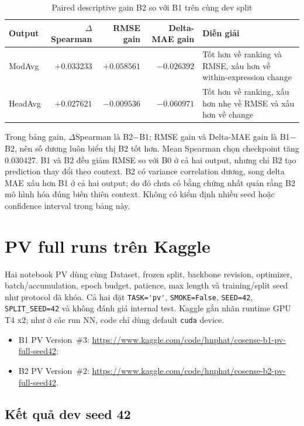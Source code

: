 \documentclass[11pt,a4paper]{article}
\newcommand{\code}[1]{\nolinkurl{#1}}
\begin{document}
\begin{table}[htbp]
\centering
\caption{Paired descriptive gain B2 so với B1 trên cùng dev split}
\small
\begin{tabularx}{\textwidth}{@{}lrrrY@{}}
\toprule
Output & $\Delta$Spearman & RMSE gain & Delta-MAE gain & Diễn giải \\
\midrule
ModAvg & $+0.033233$ & $+0.058561$ & $-0.026392$ & Tốt hơn về ranking và RMSE, xấu hơn về within-expression change \\
HeadAvg & $+0.027621$ & $-0.009536$ & $-0.060971$ & Tốt hơn về ranking, xấu hơn nhẹ về RMSE và xấu hơn về change \\
\bottomrule
\end{tabularx}
\end{table}

Trong bảng gain, $\Delta$Spearman là B2$-$B1; RMSE gain và Delta-MAE gain là B1$-$B2, nên số dương luôn biểu thị B2 tốt hơn. Mean Spearman chọn checkpoint tăng 0.030427. B1 và B2 đều giảm RMSE so với B0 ở cả hai output, nhưng chỉ B2 tạo prediction thay đổi theo context. B2 có variance correlation dương, song delta MAE xấu hơn B1 ở cả hai output; do đó chưa có bằng chứng nhất quán rằng B2 mô hình hóa đúng biến thiên context. Không có kiểm định nhiều seed hoặc confidence interval trong bảng này.

\section{PV full runs trên Kaggle}

Hai notebook PV dùng cùng Dataset, frozen split, backbone revision, optimizer, batch/accumulation, epoch budget, patience, max length và training/split seed như protocol đã khóa. Cả hai đặt \code{TASK='pv'}, \code{SMOKE=False}, \code{SEED=42}, \code{SPLIT_SEED=42} và không đánh giá internal test. Kaggle gắn nhãn runtime GPU T4 x2; như ở các run NN, code chỉ dùng default \code{cuda} device.

\begin{itemize}
  \item B1 PV Version~\#3: \url{https://www.kaggle.com/code/hnphat/cosense-b1-pv-full-seed42};
  \item B2 PV Version~\#2: \url{https://www.kaggle.com/code/hnphat/cosense-b2-pv-full-seed42}.
\end{itemize}

\subsection{Kết quả dev seed 42}
\end{document}
